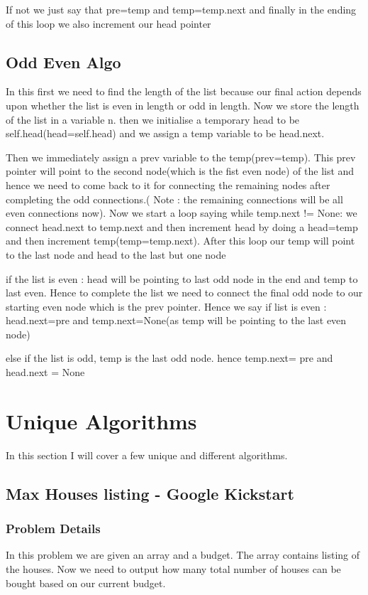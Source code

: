 \documentclass{article}
\newcommand{\nd}{\noindent}
\begin{document}
\nd If not we just say that pre=temp and temp=temp.next and finally in the ending of this loop we also increment our head pointer

\subsection{Odd Even Algo}
In this first we need to find the length of the list because our final action depends upon whether the list is even in length or odd in length. Now we store 
the length of the list in a variable n. then we initialise a temporary head to be self.head(head=self.head) and we assign a temp variable to be head.next.

\nd Then we immediately assign a prev variable to the temp(prev=temp). This prev pointer will point to the second node(which is the fist even node) of the list and hence we need to come back to it for connecting the remaining nodes
after completing the odd connections.( Note : the remaining connections will be all even connections now). Now we start a loop saying while temp.next != None: we connect head.next to temp.next 
and then increment head by doing a head=temp and then increment temp(temp=temp.next). After this loop our temp will point to the last node and head to the last but one node 

\nd if the list is even : head will be pointing to last odd node in the end and temp to last even. Hence to complete the list we need to connect the final odd node to our starting even node
which is the prev pointer. Hence we say if list is even : head.next=pre and temp.next=None(as temp will be pointing to the last even node)

\nd else if the list is odd, temp is the last odd node. hence temp.next= pre and head.next = None 
 
 \section{Unique Algorithms} 
 
In this section I will cover a few unique and different algorithms. 
\subsection{Max Houses listing - Google Kickstart}
\subsubsection{Problem Details}
In this problem we are given an array and a budget. The array contains listing of the houses. Now we need to output how many total number of houses can be bought based on our current budget.
\end{document}
